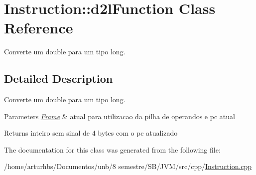 \hypertarget{classInstruction_1_1d2lFunction}{}\section{Instruction\+:\+:d2l\+Function Class Reference}
\label{classInstruction_1_1d2lFunction}


Converte um double para um tipo long.  




\subsection{Detailed Description}
Converte um double para um tipo long. 


\begin{DoxyParams}{Parameters}
{\em \hyperlink{classFrame}{Frame}} & atual para utilizacao da pilha de operandos e pc atual \\
\hline
\end{DoxyParams}
\begin{DoxyReturn}{Returns}
inteiro sem sinal de 4 bytes com o pc atualizado 
\end{DoxyReturn}


The documentation for this class was generated from the following file\+:\begin{DoxyCompactItemize}
\item 
/home/arturhbs/\+Documentos/unb/8 semestre/\+S\+B/\+J\+V\+M/src/cpp/\hyperlink{Instruction_8cpp}{Instruction.\+cpp}\end{DoxyCompactItemize}
